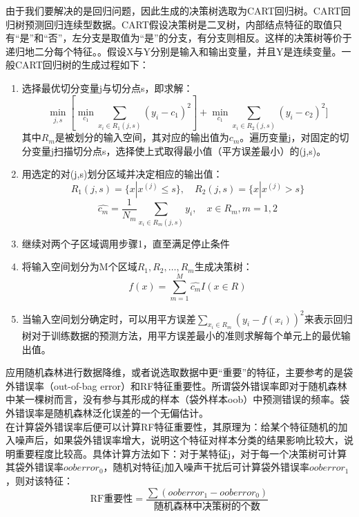 \documentclass[a4paper]{article}
\begin{document}
由于我们要解决的是回归问题，因此生成的决策树选取为CART回归树。CART回归树预测回归连续型数据。CART假设决策树是二叉树，内部结点特征的取值只有“是”和“否”，左分支是取值为“是”的分支，有分支则相反。这样的决策树等价于递归地二分每个特征。。假设X与Y分别是输入和输出变量，并且Y是连续变量。一般CART回归树的生成过程如下：
\begin{enumerate}
\item 选择最优切分变量j与切分点s，即求解：
\begin{equation}
\min_{j,s}[\min_{c_1}\sum_{x_i \in R_1(j,s)}(y_i-c_1)^2]+\min_{c_1}\sum_{x_i \in R_2(j,s)}(y_i-c_2)^2] 
\end{equation}
其中$R_m$是被划分的输入空间，其对应的输出值为$c_m$。遍历变量j，对固定的切分变量j扫描切分点s，选择使上式取得最小值（平方误差最小）的(j,s)。
\item 用选定的对(j,s)划分区域并决定相应的输出值：
\begin{equation}
R_1(j,s)=\{x|x^{(j)}\leq s\},\quad R_2(j,s)=\{x|x^{(j)} > s\}
\end{equation}
\begin{equation}
\hat{c_{m}}=\frac{1}{N_m} \sum_{x_i \in R_m (j,s)} y_i, \quad x\in R_m,m=1,2
\end{equation}
\item 继续对两个子区域调用步骤1，直至满足停止条件
\item 将输入空间划分为M个区域$R_1,R_2,\ldots,R_m$生成决策树：
\begin{equation}
f(x)=\sum_{m=1}^{M}\hat{c_{m}}I(x\in R)
\end{equation}
\item 当输入空间划分确定时，可以用平方误差$\sum_{x_i \in R_m}(y_i-f(x_i))^2$来表示回归树对于训练数据的预测方法，用平方误差最小的准则求解每个单元上的最优输出值。
\end{enumerate}

应用随机森林进行数据降维，或者说选取数据中更“重要”的特征，主要参考的是袋外错误率（out-of-bag error）和RF特征重要性。所谓袋外错误率即对于随机森林中某一棵树而言，没有参与其形成的样本（袋外样本oob）中预测错误的频率。袋外错误率是随机森林泛化误差的一个无偏估计。\\

在计算袋外错误率后便可以计算RF特征重要性，其原理为：给某个特征随机的加入噪声后，如果袋外错误率增大，说明这个特征对样本分类的结果影响比较大，说明重要程度比较高。具体计算方法如下：对于某特征j，对于每一个决策树可计算其袋外错误率$oob error_0$，随机对特征j加入噪声干扰后可计算袋外错误率$oob error_1$，则对该特征：
\begin{equation}
\text{RF重要性}=\frac{\sum(oob error_1-oob error_0)}{\text{随机森林中决策树的个数}}
\end{equation}
\end{document}
